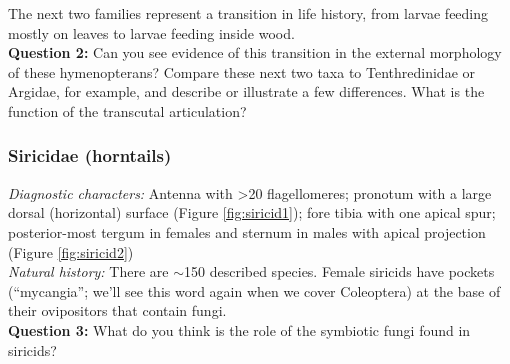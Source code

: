 \documentclass[letterpaper, 11pt]{article}
\begin{document}
\noindent{}The next two families represent a transition in life history, from larvae feeding mostly on leaves to larvae feeding inside wood. \\

\noindent\textbf{Question 2:} Can you see evidence of this transition in the external morphology of these hymenopterans? Compare these next two taxa to Tenthredinidae or Argidae, for example, and describe or illustrate a few differences. What is the function of the transcutal articulation?\vspace{3cm}

\subsubsection{Siricidae (horntails)}
\noindent{}\textit{Diagnostic characters:} Antenna with \textgreater{}20 flagellomeres; pronotum with a large dorsal (horizontal) surface (Figure \ref{fig:siricid1}); fore tibia with one apical spur; posterior-most tergum in females and sternum in males with apical projection (Figure \ref{fig:siricid2})\\

\noindent{}\textit{Natural history:} There are $\sim$150 described species. Female siricids have pockets (``mycangia''; we'll see this word again when we cover Coleoptera) at the base of their ovipositors that contain fungi. \\

\noindent\textbf{Question 3:} What do you think is the role of the symbiotic fungi found in siricids?\vspace{3cm}
\end{document}
